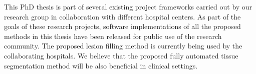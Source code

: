 This PhD thesis is part of several existing project frameworks carried out by our research group in collaboration with different hospital centers. As part of the goals of these research projects, software implementations of all the proposed methods in this thesis have been released for public use of the research community. The proposed lesion filling method is currently being used by the collaborating hospitals. We believe that the proposed fully automated tissue segmentation method will be also beneficial in clinical settings.  










